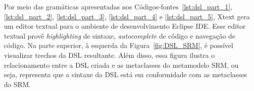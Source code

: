 


Por meio das gramáticas apresentadas nos Códigos-fontes~\ref{lst:dsl_part_1}, \ref{lst:dsl_part_2}, \ref{lst:dsl_part_3}, \ref{lst:dsl_part_4} e \ref{lst:dsl_part_5}, Xtext gera um editor textual para o ambiente de desenvolvimento Eclipse IDE. Esse editor textual provê \textit{highlighting} de sintaxe, \textit{autocomplete} de código e navegação de código. Na parte superior, à esquerda da Figura~\ref{fig:DSL_SRM}, é possível visualizar trechos da DSL resultante. Além disso, essa figura ilustra o relacionamento entre a DSL criada e as metaclasses do metamodelo SRM, ou seja, representa que a sintaxe da DSL está em conformidade com as metaclasses do SRM.

